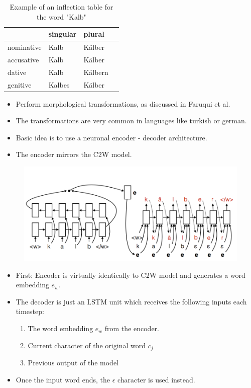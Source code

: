 \documentclass[11pt, a4paper, landscape]{article}
\begin{document}
\NewPage{}

\vfill
\begin{table}
\begin{center}
\begin{tabular}{ l l l l }
  \hline
             & singular & plural \\ \hline
  nominative & Kalb & K\"alber \\
  accusative & Kalb & K\"alber \\
  dative & Kalb & K\"albern \\
  genitive & Kalbes & K\"alber \\
\end{tabular}
\end{center}
\caption{Example of an inflection table for the word "Kalb" }
\end{table}
\vfill
\begin{itemize}
\item Perform morphological transformations, as discussed in Faruqui et al. \cite{DBLP:journals/corr/FaruquiTND15}
\item The transformations are very common in languages like turkish or german.
\item Basic idea is to use a neuronal encoder - decoder architecture.
\item The encoder mirrors the C2W model.
\end{itemize}
\vfill

\NewPage{}

\begin{figure}[H]
\begin{center}
  \includegraphics[width=.6\linewidth]{../article/img/inflection-generation}
\end{center}
\end{figure}
\begin{itemize}
\item First: Encoder is virtually identically to C2W model and generates a word embedding $e_{w}$.
\item The decoder is just an LSTM unit which receives the following inputs each timestep:
  \begin{enumerate}
    \item The word embedding $e_{w}$ from the encoder.
    \item Current character of the original word $c_j$
    \item Previous output of the model
  \end{enumerate}
\item Once the input word ends, the  $\epsilon$ character is used instead.
\end{itemize}
\end{document}
